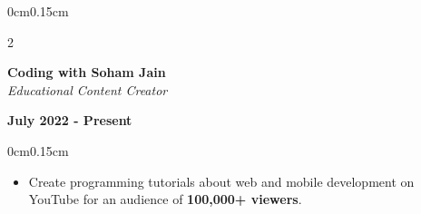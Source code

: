 \documentclass[10pt, letterpaper]{article}
\newenvironment{highlights}{
    \begin{itemize}[topsep=0pt, parsep=0pt, partopsep=0pt, itemsep=0pt, leftmargin=0.6cm]
}{
    \end{itemize}
}
\newenvironment{onecolentry}{
    \begin{adjustwidth}{0cm}{0.15cm}
}{
    \end{adjustwidth}
}
\newenvironment{twocolentry}[2][]{
    \onecolentry
    \def\secondColumn{#2}
    \setcolumnwidth{\fill, 4cm}
    \begin{paracol}{2}
}{
    \switchcolumn \raggedleft \secondColumn
    \end{paracol}
    \endonecolentry
}
\begin{document}
    \vspace{0.05cm}

    \begin{twocolentry}{\textbf{July 2022 - Present}}
        \textbf{Coding with Soham Jain} \\
        \textit{Educational Content Creator}
    \end{twocolentry}
    \vspace{-0.1cm}
    \begin{onecolentry}
        \begin{highlights}
            \item Create programming tutorials about web and mobile development on YouTube for an audience of \textbf{100,000+ viewers}.
        \end{highlights}
    \end{onecolentry}
\end{document}
